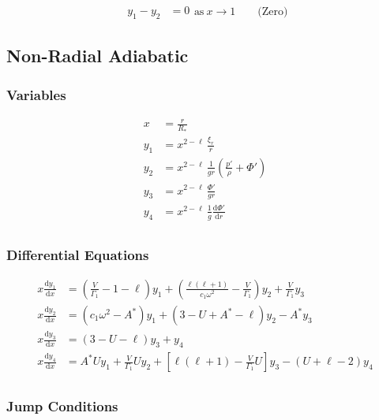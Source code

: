 \documentclass[fleqn]{article}
\newcommand{\diff}{\ensuremath{\mathrm{d}}}
\newcommand{\Vg}{\ensuremath{\frac{V}{\Gamma_{1}}}}
\newcommand{\As}{\ensuremath{A^{\ast}}}
\newcommand{\Rstar}{\ensuremath{R_{\ast}}}
\begin{document}
\begin{equation*}
\begin{aligned}
y_{1} - y_{2} &= 0
\end{aligned}
\text{as}\ x \rightarrow 1 \qquad \text{(Zero)}
\end{equation*}


\newpage

\subsection*{Non-Radial Adiabatic}

\subsubsection*{Variables}

\begin{align*}
x     &= \frac{r}{\Rstar} \\
y_{1} &= x^{2-\ell}\, \frac{\xi_{r}}{r} \\
y_{2} &= x^{2-\ell}\, \frac{1}{gr} \left( \frac{p'}{\rho} + \Phi' \right) \\
y_{3} &= x^{2-\ell}\, \frac{\Phi'}{gr} \\
y_{4} &= x^{2-\ell}\, \frac{1}{g} \frac{\diff \Phi'}{\diff r} \\
\end{align*}

\subsubsection*{Differential Equations}

\begin{align*}
x \frac{\diff y_{1}}{\diff x} &=
\left(\Vg - 1 - \ell \right) y_{1} +
\left(\frac{\ell(\ell+1)}{c_{1} \omega^{2}} - \Vg \right) y_{2} +
\Vg y_{3} \\
x \frac{\diff y_{2}}{\diff x} &=
(c_{1} \omega^{2} - \As ) y_{1} +
(3 - U + \As - \ell) y_{2} -
\As y_{3} \\
x \frac{\diff y_{3}}{\diff x} &=
(3 - U - \ell) y_{3} +
y_{4} \\
x \frac{\diff y_{4}}{\diff x} &=
\As U y_{1} +
\Vg U y_{2} +
\left[ \ell(\ell+1) - \Vg U \right] y_{3} -
(U + \ell - 2) y_{4} \\
\end{align*}

\subsubsection*{Jump Conditions}
\end{document}
